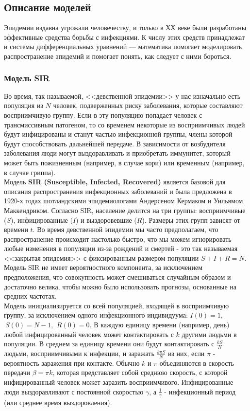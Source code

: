 \documentclass{article}
\begin{document}
\subsection{Описание моделей}

\noindent Эпидемии издавна угрожали человечеству, и только в ХХ веке были разработаны эффективные средства борьбы с инфекциями. К числу этих средств принадлежат и системы дифференциальных уравнений — математика помогает моделировать распространение эпидемий и помогает понять, как следует с ними бороться.

\subsubsection{Модель SIR}

\noindent Во время, так называемой, <<девственной эпидемии>> у нас изначально есть популяция из $N$ человек, подверженных риску заболевания, которые составляют восприимчивую группу. Если в эту популяцию попадает человек с трансмиссивным патогеном, то со временем некоторые из восприимчивых людей будут инфицированы и станут частью инфекционной группы, члены которой будут способствовать дальнейшей передаче. В зависимости от возбудителя заболевания люди могут выздоравливать и приобретать иммунитет, который может быть пожизненным (например, в случае кори) или временным (например, в случае гриппа).\\

\noindent Модель \textbf{SIR (Susceptible, Infected, Recovered)} является базовой для описания распространения инфекционных заболеваний и была предложена в 1920-х годах шотландскими эпидемиологами Андерсеном Кермаком и Уильямом Маккендриком. Согласно SIR, население делится на три группы: восприимчивые ($S$), инфицированные ($I$) и выздоровевшие ($R$). Размеры этих групп зависят от времени $t$. Во время девственной эпидемии мы часто предполагаем, что распространение происходит настолько быстро, что мы можем игнорировать любые изменения в популяции из-за рождений и смертей - это так называемая <<закрытая эпидемия>> с фиксированным размером популяции $S + I + R = N$. Модель SIR не имеет вероятностного компонента, за исключением предположения, что совокупность может смешиваться случайным образом и достаточно велика, чтобы можно было использовать прогнозы, основанные на средних частотах. \\

\noindent Модель инициализируется со всей популяцией, входящей в восприимчивую группу, за исключением одного инфекционного индивидуума: $I(0) = 1$,$~S(0) = N - 1$, $~R(0) = 0$. В каждую единицу времени (например, день) любой инфицированный человек может контактировать с $k$ другими людьми в популяции. В среднем за единицу времени они будут контактировать с $\frac{kS}{N}$ людьми, восприимчивыми к инфекции, и заражать $\frac{k\pi S}{N}$ из них, если $\pi$ - вероятность заражения при контакте. Обычно $k$ и $\pi$ объединяются в скорость передачи $\beta=\pi k$, которая представляет собой среднюю скорость, с которой инфицированный человек может заразить восприимчивого. Инфицированные люди выздоравливают с постоянной скоростью $\gamma$, а $\frac{1}{\gamma}$ - инфекционный период (или среднее время выздоровления).\\
\end{document}
